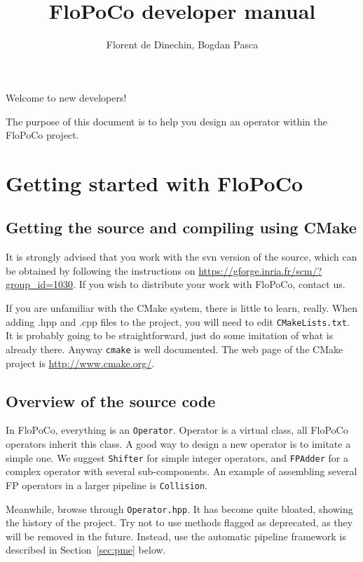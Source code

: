 \documentclass{article}
\title{\scalebox{0.3}{\mbox{}}\\
FloPoCo  developer manual
}
\author{Florent de Dinechin, Bogdan Pasca}
\begin{document}
 
\sloppy



\maketitle


Welcome to new developers! 

The purpose of this document is to help you design an operator within the
FloPoCo project.

 \section{Getting started with FloPoCo}


\subsection{Getting the source and compiling using CMake}

It is strongly advised that you work with the svn version of the
source, which can be obtained by following the instructions on
\url{https://gforge.inria.fr/scm/?group_id=1030}. If you wish to
distribute your work with FloPoCo,  contact us.

If you are unfamiliar with the CMake system, there is little to learn,
really. When adding .hpp and .cpp files to the project, you will need
to edit \texttt{CMakeLists.txt}. It is probably going to be straightforward,
just do some imitation of what is already there. Anyway \texttt{cmake} is well
documented. The web page of the CMake project is \url{http://www.cmake.org/}.


\subsection{Overview of the source code}

In FloPoCo, everything is an \texttt{Operator}. Operator is a virtual
class, all FloPoCo operators inherit this class. A good way to design
a new operator is to imitate a simple one. We suggest
\texttt{Shifter} for simple integer operators, and \texttt{FPAdder}
for a complex operator with several sub-components. An example of
assembling several FP operators in a larger pipeline is
\texttt{Collision}.

 Meanwhile, browse
through \texttt{Operator.hpp}. It has become quite bloated, showing
the history of the project. Try not to use methods flagged as
deprecated, as they will be removed in the future.  Instead, use the
automatic pipeline framework is described in Section~\ref{sec:pme}
below.
\end{document}
